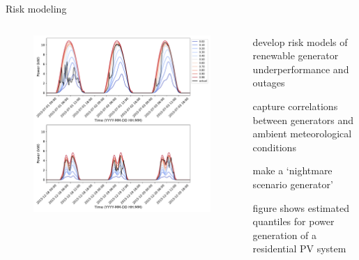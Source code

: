\documentclass[aspectratio=169,11pt]{beamer}
\begin{document}
\begin{frame}{Risk modeling}
\begin{columns}
	\begin{column}{0.55\textwidth}
		\begin{figure}
			\centering
			\includegraphics[width=\columnwidth]{./figures/quantiles_mapped_back.pdf}
		\end{figure}
	\end{column}
	\begin{column}{0.45\textwidth}
		\BIT
		\item develop risk models of renewable generator underperformance and outages
		\item capture correlations between generators and ambient meteorological conditions
		\item make a `nightmare scenario generator'
		\item figure shows estimated quantiles for power generation of a residential PV system
		\EIT
	\end{column}
\end{columns}
\end{frame}
\end{document}
